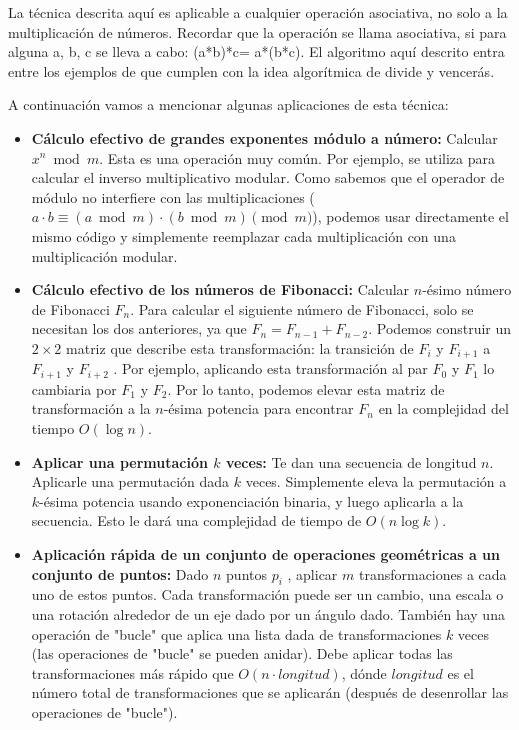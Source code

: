 La técnica descrita aquí es aplicable a cualquier operación asociativa, no solo a la multiplicación de números. Recordar que la operación se llama asociativa, si para alguna a, b, c se lleva a cabo: (a*b)*c= a*(b*c). El algoritmo aquí descrito entra entre los ejemplos de que cumplen con la idea algorítmica de divide y vencerás.

A continuación vamos a mencionar algunas aplicaciones de esta técnica:

\begin{itemize}
	\item \textbf{Cálculo efectivo de grandes exponentes módulo a número:} Calcular $x^n \bmod m$. Esta 
	es una operación muy común. Por ejemplo, se utiliza para calcular el inverso multiplicativo modular.  
	Como sabemos que el operador de módulo no interfiere con las multiplicaciones ($a \cdot b \equiv (a 
	\bmod m) \cdot (b \bmod m) \pmod m$), podemos usar directamente el mismo código y simplemente 
	reemplazar cada multiplicación con una multiplicación modular.
	 
	\item \textbf{Cálculo efectivo de los números de Fibonacci:} Calcular $n$-ésimo número de 
	Fibonacci $F_n$. Para calcular el siguiente número de Fibonacci, solo se necesitan los dos 
	anteriores, ya que $F_n = F_{n-1} + F_{n-2}$. Podemos construir un $2 \times 2$ matriz que 
	describe esta transformación: la transición de $F_i$ y $F_{i+1}$ a $F_{i+1}$ y $F_{i+2}$ . Por 
	ejemplo, aplicando esta transformación al par $F_0$ y $F_1$ lo cambiaria por $F_1$ y $F_2$. Por lo 
	tanto, podemos elevar esta matriz de transformación a la $n$-ésima potencia para encontrar $F_n$ en la complejidad del tiempo $O(\log n)$.
	
	\item \textbf{Aplicar una permutación $k$ veces:} Te dan una secuencia de longitud $n$. Aplicarle 
	una permutación dada $k$ veces. Simplemente eleva la permutación a $k$-ésima potencia usando 
	exponenciación binaria, y luego aplicarla a la secuencia. Esto le dará una complejidad de tiempo de 
	$O(n \log k)$.
	
	
	\item \textbf{Aplicación rápida de un conjunto de operaciones geométricas a un conjunto de puntos:}
	Dado $n$ puntos $p_i$ , aplicar $m$ transformaciones a cada uno de estos puntos. Cada transformación puede ser un cambio, una escala o una rotación alrededor de un eje dado por un ángulo dado. También hay una operación de "bucle" que aplica una lista dada de transformaciones $k$ veces (las operaciones de "bucle" se pueden anidar). Debe aplicar todas las transformaciones más rápido que $O(n \cdot longitud)$, dónde $longitud$ es el número total de transformaciones que se aplicarán (después de desenrollar las operaciones de "bucle").
	

\end{itemize}
